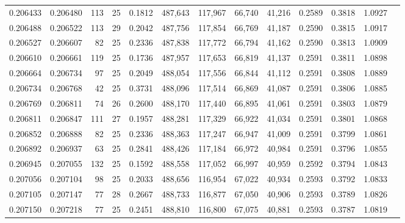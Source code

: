 \begin{tabular}{rrrrrrrrrrrrr}
0.206433 & 0.206480 & 113 &  25 &                                     0.1812 & 487,643 & 117,967 &  66,740 &  41,216 & 0.2589 & 0.3818 & 1.0927 \\
0.206488 & 0.206522 & 113 &  29 &                                     0.2042 & 487,756 & 117,854 &  66,769 &  41,187 & 0.2590 & 0.3815 & 1.0917 \\
0.206527 & 0.206607 &  82 &  25 &                                     0.2336 & 487,838 & 117,772 &  66,794 &  41,162 & 0.2590 & 0.3813 & 1.0909 \\
0.206610 & 0.206661 & 119 &  25 &                                     0.1736 & 487,957 & 117,653 &  66,819 &  41,137 & 0.2591 & 0.3811 & 1.0898 \\
0.206664 & 0.206734 &  97 &  25 &                                     0.2049 & 488,054 & 117,556 &  66,844 &  41,112 & 0.2591 & 0.3808 & 1.0889 \\
0.206734 & 0.206768 &  42 &  25 &                                     0.3731 & 488,096 & 117,514 &  66,869 &  41,087 & 0.2591 & 0.3806 & 1.0885 \\
0.206769 & 0.206811 &  74 &  26 &                                     0.2600 & 488,170 & 117,440 &  66,895 &  41,061 & 0.2591 & 0.3803 & 1.0879 \\
0.206811 & 0.206847 & 111 &  27 &                                     0.1957 & 488,281 & 117,329 &  66,922 &  41,034 & 0.2591 & 0.3801 & 1.0868 \\
0.206852 & 0.206888 &  82 &  25 &                                     0.2336 & 488,363 & 117,247 &  66,947 &  41,009 & 0.2591 & 0.3799 & 1.0861 \\
0.206892 & 0.206937 &  63 &  25 &                                     0.2841 & 488,426 & 117,184 &  66,972 &  40,984 & 0.2591 & 0.3796 & 1.0855 \\
0.206945 & 0.207055 & 132 &  25 &                                     0.1592 & 488,558 & 117,052 &  66,997 &  40,959 & 0.2592 & 0.3794 & 1.0843 \\
0.207056 & 0.207104 &  98 &  25 &                                     0.2033 & 488,656 & 116,954 &  67,022 &  40,934 & 0.2593 & 0.3792 & 1.0833 \\
0.207105 & 0.207147 &  77 &  28 &                                     0.2667 & 488,733 & 116,877 &  67,050 &  40,906 & 0.2593 & 0.3789 & 1.0826 \\
0.207150 & 0.207218 &  77 &  25 &                                     0.2451 & 488,810 & 116,800 &  67,075 &  40,881 & 0.2593 & 0.3787 & 1.0819 \\

\end{tabular}

